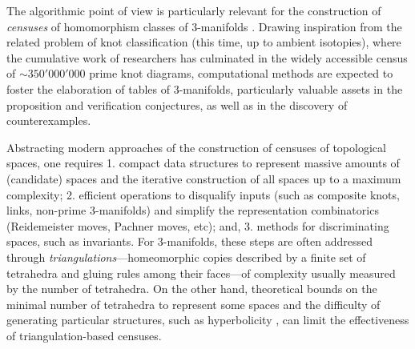 \documentclass[11pt]{amsart}
\numberwithin{equation}{section}
\theoremstyle{plain}
\theoremstyle{definition}
\begin{document}
The algorithmic point of view is particularly relevant for the construction of \emph{censuses} of homomorphism classes of 3-manifolds \cite{burton2004efficient, burton2014cusped, Burton2020_TabulationKnots3Manifolds, burton2015edge}. 
Drawing inspiration from the related problem of knot classification (this time, up to ambient isotopies), where the cumulative work of researchers \cite{burton2020next, conway1970enumeration, dowker1983classification} has culminated in the widely accessible census of $\sim 350'000'000$ prime knot diagrams, computational methods are expected to foster the elaboration of tables of 3-manifolds, particularly valuable assets in the proposition and verification conjectures, as well as in the discovery of counterexamples. 

Abstracting modern approaches \cite{burke_et_al:LIPIcs.SoCG.2025.28, burton2014cusped, burton2020next, burton2015edge} of the construction of censuses of topological spaces, one requires 1. compact data structures to represent massive amounts of (candidate) spaces and the iterative construction of all spaces up to a maximum complexity; 2. efficient operations to disqualify inputs (such as {composite} knots, links, non-prime 3-manifolds) and simplify the representation combinatorics (Reidemeister moves, Pachner moves, etc); and, 3. methods for discriminating spaces, such as invariants. 
For 3-manifolds, these steps are often addressed through \emph{triangulations}---homeomorphic copies described by a finite set of tetrahedra and gluing rules among their faces---of complexity usually measured by the number of tetrahedra. 
On the other hand, theoretical bounds on the minimal number of tetrahedra to represent some spaces \cite{datta2007minimal, jaco20030, jaco2006layered, matveev2007algorithmic} and the difficulty of generating particular structures, such as hyperbolicity \cite{matveev2007algorithmic}, can limit the effectiveness of triangulation-based censuses.
\end{document}
